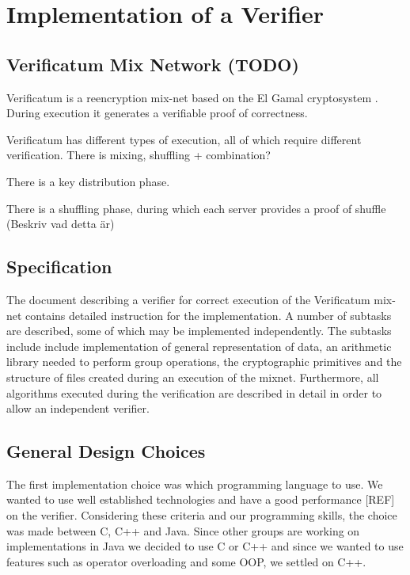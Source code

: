 \section{Implementation of a Verifier}

\subsection{Verificatum Mix Network (TODO)}

Verificatum is a reencryption mix-net based on the El Gamal
cryptosystem \cite[p.~1]{wikstrom1}. During execution it generates a
verifiable proof of correctness. 


Verificatum has different types of execution, all of which require
different verification. There is mixing, shuffling + combination?

There is a key distribution phase.

There is a shuffling phase, during which each server provides a proof
of shuffle (Beskriv vad detta är)

\subsection{Specification}

The document \cite{wikstrom1} describing a verifier for correct execution of the
Verificatum mix-net contains detailed instruction for the
implementation. A number of subtasks are described, some of which may
be implemented independently. The subtasks include include
implementation of general representation of data, an arithmetic
library needed to perform group operations, the cryptographic
primitives and the structure of files created during an execution of
the mixnet. Furthermore, all algorithms executed during the
verification are described in detail in order to allow an independent
verifier.

\subsection{General Design Choices}

The first implementation choice was which programming language to
use. We wanted to use well established technologies and have a good
performance [REF] on the verifier. Considering these criteria and our
programming skills, the choice was made between C, C++ and Java. Since
other groups are working on implementations in Java we decided to use
C or C++ and since we wanted to use features such as operator
overloading and some OOP, we settled on C++.

